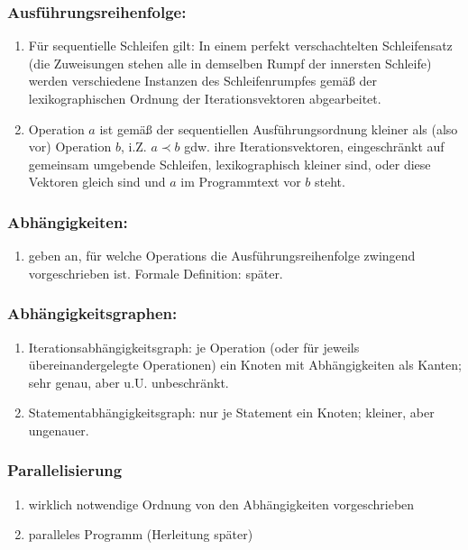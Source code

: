 \subsubsection{Ausführungsreihenfolge:}
  \begin{enumerate}
  \item Für sequentielle Schleifen gilt: In einem perfekt
    verschachtelten Schleifensatz (die Zuweisungen stehen alle in
    demselben Rumpf der innersten Schleife) werden verschiedene
    Instanzen des Schleifenrumpfes gemäß der lexikographischen Ordnung
    der Iterationsvektoren abgearbeitet.
  \item Operation $a$ ist gemäß der sequentiellen Ausführungsordnung
    kleiner als (also vor) Operation $b$, i.Z. $a \prec b$ gdw. ihre
    Iterationsvektoren, eingeschränkt auf gemeinsam umgebende Schleifen,
    lexikographisch kleiner sind, oder diese Vektoren gleich sind und
    $a$ im Programmtext vor $b$ steht.
  \end{enumerate}
\subsubsection{Abhängigkeiten:}
  \begin{enumerate}
  \item geben an, für welche Operations die Ausführungsreihenfolge
    zwingend vorgeschrieben ist. Formale Definition: später.
  \end{enumerate}
\subsubsection{Abhängigkeitsgraphen:}
  \begin{enumerate}
  \item Iterationsabhängigkeitsgraph: je Operation (oder für jeweils
    übereinandergelegte Operationen) ein Knoten mit Abhängigkeiten als
    Kanten; sehr genau, aber u.U. unbeschränkt.
  \item Statementabhängigkeitsgraph: nur je Statement ein Knoten;
    kleiner, aber ungenauer.
  \end{enumerate}
\subsubsection{Parallelisierung}
  \begin{enumerate}
  \item wirklich notwendige Ordnung von den Abhängigkeiten vorgeschrieben
  \item paralleles Programm (Herleitung später)
  \end{enumerate}

